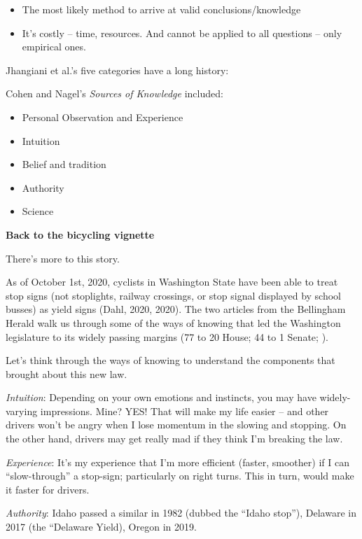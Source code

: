 \documentclass[
  english,
]{book}
\providecommand{\tightlist}{%
  \setlength{\itemsep}{0pt}\setlength{\parskip}{0pt}}
\begin{document}
\begin{itemize}
  \begin{itemize}
  \tightlist
  \item
    The most likely method to arrive at valid conclusions/knowledge
  \item
    It's costly -- time, resources. And cannot be applied to all questions -- only empirical ones.
  \end{itemize}
\end{itemize}

Jhangiani et al.'s \citeyearpar{jhangiani_research_2019} five categories have a long history:

Cohen and Nagel's \citeyearpar{cohen_introduction_1934} \emph{Sources of Knowledge} included:

\begin{itemize}
\tightlist
\item
  Personal Observation and Experience
\item
  Intuition
\item
  Belief and tradition
\item
  Authority
\item
  Science
\end{itemize}

\textbf{Back to the bicycling vignette}

There's more to this story.

As of October 1st, 2020, cyclists in Washington State have been able to treat stop signs (not stoplights, railway crossings, or stop signal displayed by school busses) as yield signs (Dahl, 2020, 2020). The two articles from the Bellingham Herald walk us through some of the ways of knowing that led the Washington legislature to its widely passing margins (77 to 20 House; 44 to 1 Senate; \citep{fucoloro_bipartisan_2020}).

Let's think through the ways of knowing to understand the components that brought about this new law.

\emph{Intuition}: Depending on your own emotions and instincts, you may have widely-varying impressions. Mine? YES! That will make my life easier -- and other drivers won't be angry when I lose momentum in the slowing and stopping. On the other hand, drivers may get really mad if they think I'm breaking the law.

\emph{Experience}: It's my experience that I'm more efficient (faster, smoother) if I can ``slow-through'' a stop-sign; particularly on right turns. This in turn, would make it faster for drivers.

\emph{Authority}: Idaho passed a similar in 1982 (dubbed the ``Idaho stop''), Delaware in 2017 (the ``Delaware Yield), Oregon in 2019.
\end{document}
